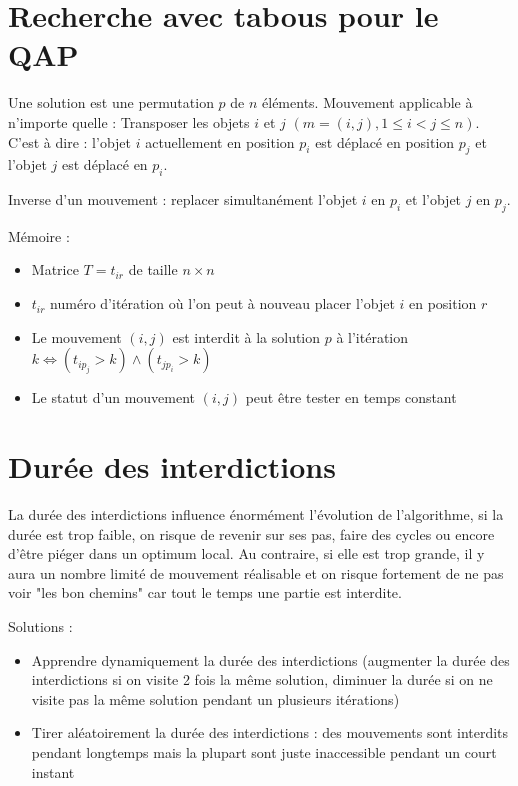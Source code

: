\documentclass[11pt,a4paper]{report}
\begin{document}
\section{Recherche avec tabous pour le QAP}
Une solution est une permutation $p$ de $n$ éléments. Mouvement applicable à n'importe quelle : Transposer les objets $i$ et $j$ $(m=(i,j),1\leq i < j\leq n)$. C'est à dire : l'objet $i$ actuellement en position $p_i$ est déplacé en position $p_j$ et l'objet $j$ est déplacé en $p_i$.

Inverse d'un mouvement : replacer simultanément l'objet $i$ en $p_i$ et l'objet $j$ en $p_j$.

Mémoire : 
\begin{itemize}
    \item Matrice $T=t_{ir}$ de taille $n\times n$
    \item $t_{ir}$ numéro d'itération où l'on peut à nouveau placer l'objet $i$ en position $r$
    \item Le mouvement $(i,j)$ est interdit à la solution $p$ à l'itération $k \Longleftrightarrow (t_{ip_j} > k) \wedge (t_{jp_i} > k)$
    \item Le statut d'un mouvement $(i,j)$ peut être tester en temps constant
\end{itemize}

\section{Durée des interdictions}
La durée des interdictions influence énormément l'évolution de l'algorithme, si la durée est trop faible, on risque de revenir sur ses pas, faire des cycles ou encore d'être piéger dans un optimum local. Au contraire, si elle est trop grande, il y aura un nombre limité de mouvement réalisable et on risque fortement de ne pas voir "les bon chemins" car tout le temps une partie est interdite.

Solutions :
\begin{itemize}
    \item Apprendre dynamiquement la durée des inter\-dictions (augmenter la durée des inter\-dictions si on visite 2 fois la même solution, diminuer la durée si on ne visite pas la même solution pendant un plusieurs itérations)
    \item Tirer aléatoirement la durée des interdictions : des mouvements sont interdits pendant longtemps mais la plupart sont juste inaccessible pendant un court instant
\end{itemize}
\end{document}

